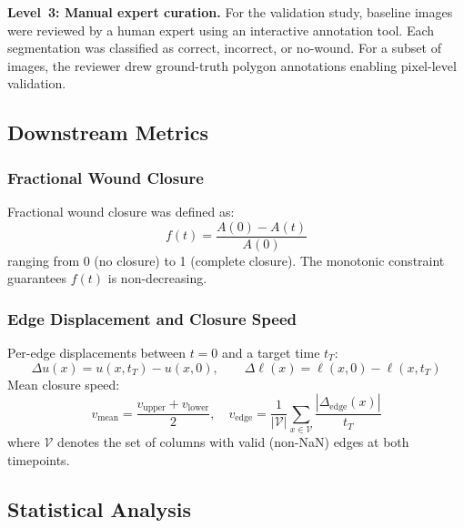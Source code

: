 \textbf{Level~3: Manual expert curation.} For the validation study, baseline images were reviewed by a human expert using an interactive annotation tool. Each segmentation was classified as correct, incorrect, or no-wound. For a subset of images, the reviewer drew ground-truth polygon annotations enabling pixel-level validation.

\subsection{Downstream Metrics}

\subsubsection{Fractional Wound Closure}
Fractional wound closure was defined as:
\begin{equation}
  f(t) = \frac{A(0) - A(t)}{A(0)}
\end{equation}
ranging from 0 (no closure) to 1 (complete closure). The monotonic constraint guarantees $f(t)$ is non-decreasing.

\subsubsection{Edge Displacement and Closure Speed}
Per-edge displacements between $t = 0$ and a target time $t_T$:
\begin{equation}
  \Delta u(x) = u(x, t_T) - u(x, 0), \qquad \Delta \ell(x) = \ell(x, 0) - \ell(x, t_T)
\end{equation}
Mean closure speed:
\begin{equation}
  v_\text{mean} = \frac{v_\text{upper} + v_\text{lower}}{2}, \quad
  v_\text{edge} = \frac{1}{|\mathcal{V}|} \sum_{x \in \mathcal{V}} \frac{|\Delta_\text{edge}(x)|}{t_T}
\end{equation}
where $\mathcal{V}$ denotes the set of columns with valid (non-NaN) edges at both timepoints.

\subsection{Statistical Analysis}

